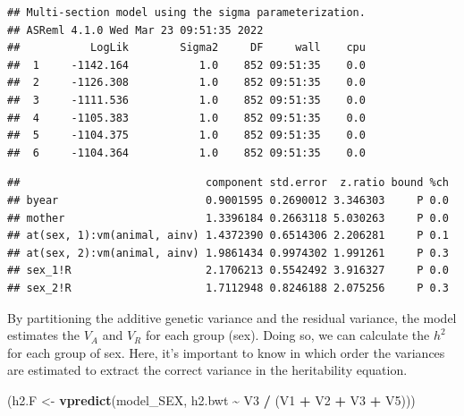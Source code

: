 \documentclass[
  12pt,
]{book}
\newenvironment{Shaded}{\begin{snugshade}}{\end{snugshade}}
\newcommand{\KeywordTok}[1]{\textcolor[rgb]{0.13,0.29,0.53}{\textbf{#1}}}
\newcommand{\NormalTok}[1]{#1}
\newcommand{\OperatorTok}[1]{\textcolor[rgb]{0.81,0.36,0.00}{\textbf{#1}}}
\newcommand{\StringTok}[1]{\textcolor[rgb]{0.31,0.60,0.02}{#1}}
\begin{document}
\begin{verbatim}
## Multi-section model using the sigma parameterization.
## ASReml 4.1.0 Wed Mar 23 09:51:35 2022
##           LogLik        Sigma2     DF     wall    cpu
##  1     -1142.164           1.0    852 09:51:35    0.0
##  2     -1126.308           1.0    852 09:51:35    0.0
##  3     -1111.536           1.0    852 09:51:35    0.0
##  4     -1105.383           1.0    852 09:51:35    0.0
##  5     -1104.375           1.0    852 09:51:35    0.0
##  6     -1104.364           1.0    852 09:51:35    0.0
\end{verbatim}

\begin{Shaded}
\end{Shaded}

\begin{verbatim}
##                             component std.error  z.ratio bound %ch
## byear                       0.9001595 0.2690012 3.346303     P 0.0
## mother                      1.3396184 0.2663118 5.030263     P 0.0
## at(sex, 1):vm(animal, ainv) 1.4372390 0.6514306 2.206281     P 0.1
## at(sex, 2):vm(animal, ainv) 1.9861434 0.9974302 1.991261     P 0.3
## sex_1!R                     2.1706213 0.5542492 3.916327     P 0.0
## sex_2!R                     1.7112948 0.8246188 2.075256     P 0.3
\end{verbatim}

By partitioning the additive genetic variance and the residual variance, the model estimates the \(V_A\) and \(V_R\) for each group (sex). Doing so, we can calculate the \(h^2\) for each group of sex. Here, it's important to know in which order the variances are estimated to extract the correct variance in the heritability equation.

\begin{Shaded}
\begin{Highlighting}[]
\NormalTok{(h2.F \textless{}{-}}\StringTok{ }\KeywordTok{vpredict}\NormalTok{(model\_SEX, h2.bwt }\OperatorTok{\textasciitilde{}}\StringTok{ }\NormalTok{V3 }\OperatorTok{/}\StringTok{ }\NormalTok{(V1 }\OperatorTok{+}\StringTok{ }\NormalTok{V2 }\OperatorTok{+}\StringTok{ }\NormalTok{V3 }\OperatorTok{+}\StringTok{ }\NormalTok{V5)))}
\end{Highlighting}
\end{Shaded}
\end{document}
